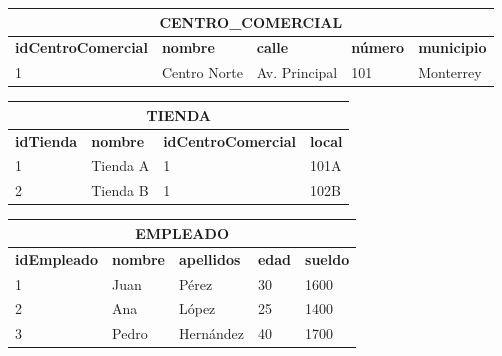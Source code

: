 \documentclass[12pt,a4paper,addpoints,answers]{exam}
\begin{document}
\begin{questions}
\begin{table}[h!]
\centering
\small
\begin{tabular}{|p{4cm}|p{2.5cm}|p{2.5cm}|p{2cm}|p{2.5cm}|}

\multicolumn{5}{c}{\textbf{CENTRO\_COMERCIAL}} \\ \hline
\textbf{idCentroComercial} & \textbf{nombre}      & \textbf{calle}         & \textbf{número} & \textbf{municipio} \\ \hline
1                          & Centro Norte         & Av. Principal          & 101             & Monterrey          \\ \hline
\end{tabular}
\end{table}

\begin{table}[h!]
\centering
\small
\begin{tabular}{|p{2cm}|p{2cm}|p{4cm}|p{1cm}|}
\multicolumn{4}{c}{\textbf{TIENDA}} \\ \hline
\textbf{idTienda} & \textbf{nombre} & \textbf{idCentroComercial} & \textbf{local} \\ \hline
1                 & Tienda A        & 1                            & 101A           \\ \hline
2                 & Tienda B        & 1                            & 102B           \\ \hline
\end{tabular}
\end{table}

\begin{table}[h!]
\centering
\small
\begin{tabular}{|p{2.5cm}|p{2.5cm}|p{2.5cm}|p{1.5cm}|p{3cm}|}
\multicolumn{5}{c}{\textbf{EMPLEADO}} \\ \hline
\textbf{idEmpleado} & \textbf{nombre} & \textbf{apellidos} & \textbf{edad} & \textbf{sueldo} \\ \hline
1                   & Juan            & Pérez              & 30            & 1600            \\ \hline
2                   & Ana             & López              & 25            & 1400            \\ \hline
3                   & Pedro           & Hernández          & 40            & 1700            \\ \hline
\end{tabular}
\end{table}


\end{questions}
\end{document}
